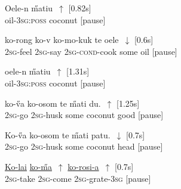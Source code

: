 \documentclass[output=paper]{LSP/langsci}
\begin{document}
 \begin{appendixexe}
 \ex \label{Guapp1}
\gll    Oele-n          \H{m}atiu~$\uparrow$ [0.82s]\\     	       
 oil-\textsc{3sg:poss} coconut [pause]\\
\glt {} 
\end{appendixexe}

 \begin{appendixexe}
 \ex \label{Guapp2}
\gll    ko-rong        ko-v       ko-mo-kuk           te      oele~$\downarrow$ [0.6s]\\     	       
\textsc{2sg}-feel     \textsc{2sg}-say   \textsc{2sg-cond}-cook   some    oil [pause]\\
\glt {} 
\end{appendixexe}

  \begin{appendixexe}
 \ex \label{Guapp3}
\gll    oele-n          \H{m}atiu~$\uparrow$ [1.31s]\\     	       
 oil-\textsc{3sg:poss} coconut [pause]\\
\glt {} 
\end{appendixexe}


  \begin{appendixexe}
 \ex \label{Guapp4}
\gll    ko-\H{v}a        ko-osom         te      \H{m}ati        du.~$\uparrow$ [1.25s]\\     	       
 \textsc{2sg}-go    \textsc{2sg}-husk      some    coconut   good [pause]\\
\glt {} 
\end{appendixexe}


  \begin{appendixexe}
 \ex \label{Guapp5}
\gll    Ko-\H{v}a        ko-osom         te      \H{m}ati        patu.~$\downarrow$ [0.7s]\\     	  
 \textsc{2sg}-go    \textsc{2sg}-husk      some    coconut   head [pause]\\
\glt {} 
\end{appendixexe}

  \begin{appendixexe}
 \ex \label{Guapp6}
\gll    \underline{Ko-lai}      \underline{ko-\H{m}a}~$\uparrow$       \underline{ko-rosi-a}~$\uparrow$ [0.7s]\\     	       
 \textsc{2sg}-take   \textsc{2sg}-come   \textsc{2sg}-grate-\textsc{3sg} [pause]\\
\glt {} 
\end{appendixexe}
\end{document}
